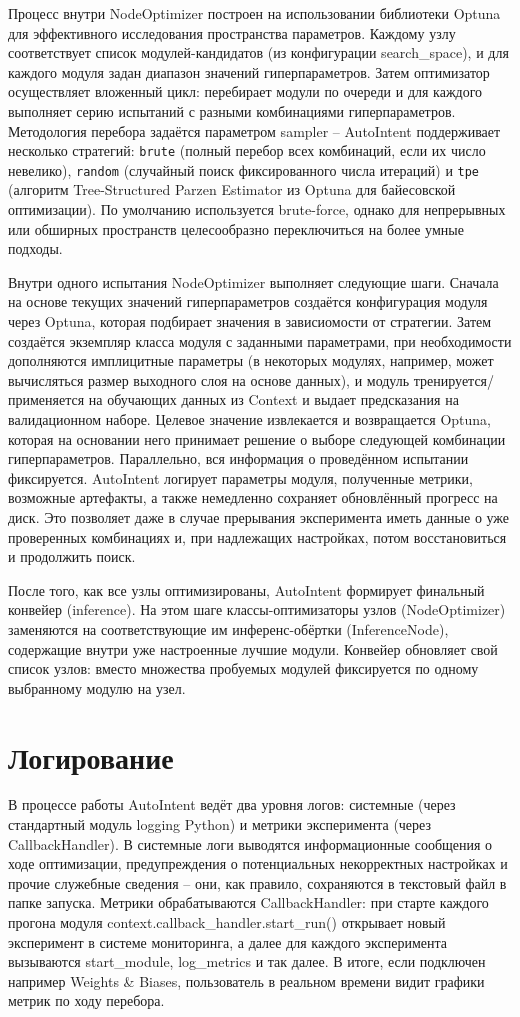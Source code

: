 \documentclass[14pt,a4paper,oneside,openany]{extbook}
\begin{document}
Процесс внутри NodeOptimizer построен на использовании библиотеки Optuna\autocite{akiba_optuna_2019a} для эффективного исследования пространства параметров. Каждому узлу соответствует список модулей-кандидатов (из конфигурации search\_space), и для каждого модуля задан диапазон значений гиперпараметров. Затем оптимизатор осуществляет вложенный цикл: перебирает модули по очереди и для каждого выполняет серию испытаний с разными комбинациями гиперпараметров. Методология перебора задаётся параметром sampler – AutoIntent поддерживает несколько стратегий: \texttt{brute} (полный перебор всех комбинаций, если их число невелико), \texttt{random} (случайный поиск фиксированного числа итераций) и \texttt{tpe} (алгоритм Tree-Structured Parzen Estimator из Optuna для байесовской оптимизации). По умолчанию используется brute-force, однако для непрерывных или обширных пространств целесообразно переключиться на более умные подходы.

Внутри одного испытания NodeOptimizer выполняет следующие шаги. Сначала на основе текущих значений гиперпараметров создаётся конфигурация модуля через Optuna, которая подбирает значения в зависиомости от стратегии. Затем создаётся экземпляр класса модуля с заданными параметрами, при необходимости дополняются имплицитные параметры (в некоторых модулях, например, может вычисляться размер выходного слоя на основе данных), и модуль тренируется/применяется на обучающих данных из Context и выдает предсказания на валидационном наборе. Целевое значение извлекается и возвращается Optuna, которая на основании него принимает решение о выборе следующей комбинации гиперпараметров. Параллельно, вся информация о проведённом испытании фиксируется. AutoIntent логирует параметры модуля, полученные метрики, возможные артефакты, а также немедленно сохраняет обновлённый прогресс на диск. Это позволяет даже в случае прерывания эксперимента иметь данные о уже проверенных комбинациях и, при надлежащих настройках, потом восстановиться и продолжить поиск.

После того, как все узлы оптимизированы, AutoIntent формирует финальный конвейер (inference). На этом шаге классы-оптимизаторы узлов (NodeOptimizer) заменяются на соответствующие им инференс-обёртки (InferenceNode), содержащие внутри уже настроенные лучшие модули. Конвейер обновляет свой список узлов: вместо множества пробуемых модулей фиксируется по одному выбранному модулю на узел.
\section{Логирование}
\label{sec:orgfb3bb30}
В процессе работы AutoIntent ведёт два уровня логов: системные (через стандартный модуль logging Python) и метрики эксперимента (через CallbackHandler). В системные логи выводятся информационные сообщения о ходе оптимизации, предупреждения о потенциальных некорректных настройках и прочие служебные сведения – они, как правило, сохраняются в текстовый файл в папке запуска. Метрики обрабатываются CallbackHandler: при старте каждого прогона модуля context.callback\_handler.start\_run() открывает новый эксперимент в системе мониторинга, а далее для каждого эксперимента вызываются start\_module, log\_metrics и так далее. В итоге, если подключен например Weights \& Biases, пользователь в реальном времени видит графики метрик по ходу перебора.
\end{document}
